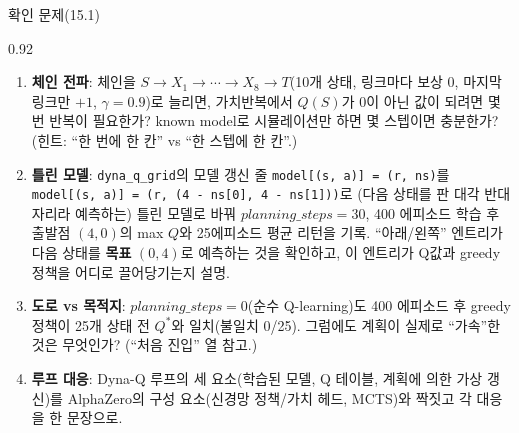 \begin{frame}{확인 문제(15.1)}
\begin{center}\begin{varwidth}{0.92\textwidth}
  \small
  \begin{enumerate}
    \item \textbf{체인 전파}: 체인을 $S \to X_1 \to \cdots \to X_8
      \to T$(10개 상태, 링크마다 보상 0, 마지막 링크만 $+1$,
      $\gamma=0.9$)로 늘리면, 가치반복에서 $Q(S)$가 0이 아닌 값이
      되려면 몇 번 반복이 필요한가? known model로 시뮬레이션만
      하면 몇 스텝이면 충분한가? (힌트: ``한 번에 한 칸'' vs
      ``한 스텝에 한 칸''.)
    \item \textbf{틀린 모델}: \texttt{dyna\_q\_grid}의 모델 갱신 줄
      \texttt{model[(s, a)] = (r, ns)}를
      \texttt{model[(s, a)] = (r, (4 - ns[0], 4 - ns[1]))}로
      (다음 상태를 판 대각 반대 자리라 예측하는) 틀린 모델로 바꿔
      $planning\_steps{=}30$, 400 에피소드 학습 후 출발점
      $(4,0)$의 max $Q$와 25에피소드 평균 리턴을 기록.
      ``아래/왼쪽'' 엔트리가 다음 상태를 \textbf{목표} $(0,4)$로
      예측하는 것을 확인하고, 이 엔트리가 Q값과 greedy 정책을
      어디로 끌어당기는지 설명.
    \item \textbf{도로 vs 목적지}: $planning\_steps{=}0$(순수
      Q-learning)도 400 에피소드 후 greedy 정책이 25개 상태 전
      $Q^{*}$와 일치(불일치 0/25). 그럼에도 계획이 실제로
      ``가속''한 것은 무엇인가? (``처음 진입'' 열 참고.)
    \item \textbf{루프 대응}: Dyna-Q 루프의 세 요소(학습된 모델,
      Q 테이블, 계획에 의한 가상 갱신)를 AlphaZero의 구성
      요소(신경망 정책/가치 헤드, MCTS)와 짝짓고 각 대응을
      한 문장으로.
  \end{enumerate}
\end{varwidth}\end{center}
\end{frame}
